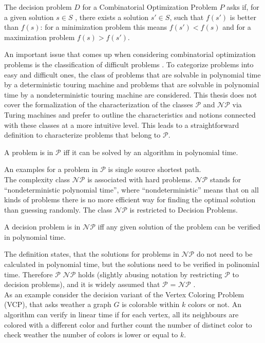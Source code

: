 \begin{definition}
The decision problem $D$ for a Combinatorial Optimization Problem $P$ asks if, for a given solution $s \in S$ , there exists a solution $s' \in S$, such that $f(s')$ is better than $f(s)$: for a minimization problem this means $f(s') < f(s)$ and for a maximization problem $f(s) > f (s')$.
\end{definition}

An important issue that comes up when considering combinatorial optimization problems is the classification of difficult problems \cite{papadimitriou-94}. To categorize problems into easy and difficult ones, the class of problems that are solvable in polynomial time by a deterministic touring machine and problems that are solvable in polynomial time by a nondeterministic touring machine are considered. This thesis does not cover the formalization of the characterization of the classes $\mathcal{P}$ and $\mathcal{NP}$ via Turing machines and prefer to outline the characteristics and notions connected with these classes at a more intuitive level. This leads to a straightforward definition to characterize problems that belong to $\mathcal{P}$\cite{neumann-10}.

\begin{definition}
A problem is in $\mathcal{P}$ iff it can be solved by an algorithm in polynomial time.
\end{definition}

An examples for a problem in $\mathcal{P}$ is single source shortest path.\\
The complexity class $\mathcal{NP}$ is associated with hard problems. $\mathcal{NP}$ stands for ``nondeterministic polynomial time'', where ``nondeterministic'' means that on all kinds of problems there is no more efficient way for finding the optimal solution than guessing randomly.
The class $\mathcal{NP}$ is restricted to Decision Problems.

\begin{definition}
A decision problem is in $\mathcal{NP}$ iff any given solution of the problem can be verified in polynomial time.
\end{definition}

The definition states, that the solutions for problems in $\mathcal{NP}$ do not need to be calculated in polynomial time, but the solutions need to be verified in polinomial time. Therefore $\mathcal{P}$ \subseteq $\mathcal{NP}$ holds (slightly abusing notation by restricting $\mathcal{P}$ to decision problems), and it is widely assumed that $\mathcal{P}$ = $\mathcal{NP}$ \cite{neumann.10}.\\
As an example consider the decision variant of the Vertex Coloring Problem (VCP), that asks weather a graph $G$ is colorable within $k$ colors or not. An algorithm can verify in linear time if for each vertex, all its neighbours are colored with a different color and further count the number of distinct color to check weather the number of colors is lower or equal to $k$.

